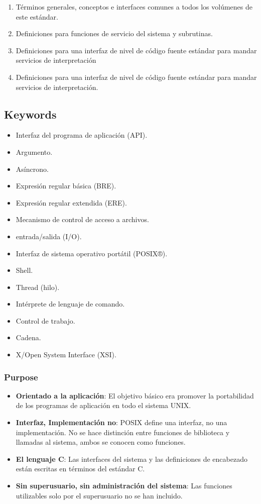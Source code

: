 \documentclass[11pt, a4paper]{report}
\begin{document}
\begin{enumerate}
\item T\'erminos generales, conceptos e interfaces comunes a todos los vol\'umenes de este est\'andar.
\item Definiciones para funciones de servicio del sistema y subrutinas.
\item Definiciones para una interfaz de nivel de c\'odigo fuente est\'andar para mandar servicios de interpretaci\'on	
\item Definiciones para una interfaz de nivel de c\'odigo fuente est\'andar para mandar servicios de interpretaci\'on.	
\end{enumerate}


 \subsection*{Keywords}
 \begin{itemize}
 \item Interfaz del programa de aplicaci\'on (API). 
 \item Argumento.
 \item As\'incrono.
 \item Expresi\'on regular b\'asica (BRE).
 \item Expresi\'on regular extendida (ERE).
 \item Mecanismo de control de acceso a archivos.
 \item entrada/salida (I/O).
 \item Interfaz de sistema operativo port\'atil (POSIX®).
 \item Shell.
 \item Thread (hilo).
 \item Int\'erprete de lenguaje de comando.
 \item Control de trabajo.
 \item Cadena.
 \item X/Open System Interface (XSI).
 \end{itemize}
 
 \subsubsection*{Purpose}
 
 \begin{itemize}
 \item \textbf{Orientado a la aplicaci\'on}: 
		El objetivo b\'asico era promover la portabilidad de los programas de aplicaci\'on en todo el sistema UNIX. 
 \item \textbf{Interfaz, Implementaci\'on no}:
        POSIX define una interfaz, no una implementaci\'on. No se hace distinci\'on entre
funciones de biblioteca y llamadas al sistema, ambos se conocen como funciones.
 \item \textbf{ El lenguaje C}: 
         Las interfaces del sistema y las definiciones de encabezado est\'an escritas en t\'erminos del est\'andar C.
 \item \textbf{Sin superusuario, sin administraci\'on del sistema}:
		​​Las funciones utilizables solo por el superusuario no se han incluido.
 \end{itemize}
 
\end{document}
